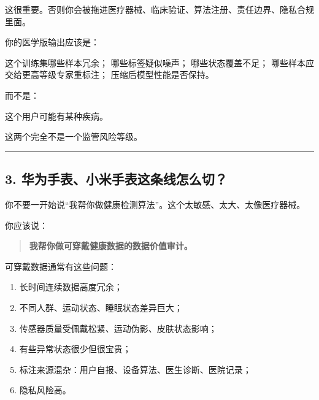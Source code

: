 \documentclass[
  12pt,
]{ctexart}
\newenvironment{Shaded}{}{}
\newcommand{\NormalTok}[1]{#1}
\providecommand{\tightlist}{%
  \setlength{\itemsep}{0pt}\setlength{\parskip}{0pt}}
\begin{document}
这很重要。否则你会被拖进医疗器械、临床验证、算法注册、责任边界、隐私合规里面。

你的医学版输出应该是：

\begin{Shaded}
\begin{Highlighting}[]
\NormalTok{这个训练集哪些样本冗余；}
\NormalTok{哪些标签疑似噪声；}
\NormalTok{哪些状态覆盖不足；}
\NormalTok{哪些样本应交给更高等级专家重标注；}
\NormalTok{压缩后模型性能是否保持。}
\end{Highlighting}
\end{Shaded}

而不是：

\begin{Shaded}
\begin{Highlighting}[]
\NormalTok{这个用户可能有某种疾病。}
\end{Highlighting}
\end{Shaded}

这两个完全不是一个监管风险等级。

\begin{center}\rule{0.5\linewidth}{0.5pt}\end{center}

\subsection{3.
华为手表、小米手表这条线怎么切？}\label{ux534eux4e3aux624bux8868ux5c0fux7c73ux624bux8868ux8fd9ux6761ux7ebfux600eux4e48ux5207}

你不要一开始说``我帮你做健康检测算法''。这个太敏感、太大、太像医疗器械。

你应该说：

\begin{quote}
\textbf{我帮你做可穿戴健康数据的数据价值审计。}
\end{quote}

可穿戴数据通常有这些问题：

\begin{enumerate}
\def\labelenumi{\arabic{enumi}.}
\tightlist
\item
  长时间连续数据高度冗余；
\item
  不同人群、运动状态、睡眠状态差异巨大；
\item
  传感器质量受佩戴松紧、运动伪影、皮肤状态影响；
\item
  有些异常状态很少但很宝贵；
\item
  标注来源混杂：用户自报、设备算法、医生诊断、医院记录；
\item
  隐私风险高。
\end{enumerate}
\end{document}

